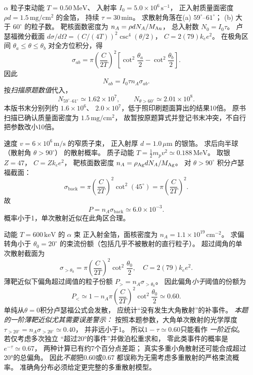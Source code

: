 $\alpha$ 粒子束动能
$T=0.50\,\mathrm{MeV}$、
入射率 $I_0=5.0\times10^6\,\mathrm{s^{-1}}$，
正入射质量面密度
$\rho d=1.5\,\mathrm{mg/cm^2}$ 的金箔，
持续 $\tau=30\,\mathrm{min}$。
求散射角落在(a) $59^\circ$--$61^\circ$；
(b) 大于 $60^\circ$ 的粒子数。
\exsolution
靶核面数密度为
$n_A=\rho dN_A/M_{\rm Au}$，
总入射数 $N_0=I_0\tau$。
卢瑟福微分截面
$d\sigma/d\Omega=(C/(4T))^2\csc^4(\theta/2)$，
$C=2(79)k_ee^2$。
在极角区间 $\theta_a\le\theta\le\theta_b$
对全方位积分，得
\[
 \sigma_{ab}=\pi\left(\frac C{2T}\right)^2
 \left[\cot^2\frac{\theta_a}{2}
 -\cot^2\frac{\theta_b}{2}\right].
\]
因此
\[
 \boxed{N_{ab}=I_0\tau n_A\sigma_{ab}}.
\]
按\emph{扫描原题数值}代入，
\[
 \boxed{N_{59^\circ\text{--}61^\circ}
 \simeq1.62\times10^7},\qquad
 \boxed{N_{\theta>60^\circ}\simeq2.01\times10^8}.
\]
\excheck 本版书末分别列约 $1.6\times10^6$、
$2.0\times10^7$，低于照印刷题面算出的结果10倍。
原书扫描已确认质量面密度为 $1.5\,\mathrm{mg/cm^2}$，
故暂按原题算式并登记书末冲突，不自行把参数改小10倍。

速度 $v=6\times10^6\,\mathrm{m/s}$ 的窄质子束，
正入射厚 $d=1.0\,\mu\mathrm m$ 的银箔。
求后向半球（散射角 $\theta>90^\circ$）
的散射概率。
\exsolution
质子动能
$T=\tfrac12m_pv^2\simeq0.188\,\mathrm{MeV}$。
取银 $Z=47$，
$C=Zk_ee^2$，
靶核面数密度
$n_A=\rho_{\rm Ag}dN_A/M_{\rm Ag}$。
对 $\theta>90^\circ$ 积分卢瑟福截面：
\[
 \sigma_{\mathrm{back}}=
 \pi\left(\frac C{2T}\right)^2\cot^2(45^\circ)
 =\pi\left(\frac C{2T}\right)^2.
\]
故
\[
 \boxed{P=n_A\sigma_{\mathrm{back}}
 \simeq6.0\times10^{-3}}.
\]
\excheck 概率小于1，单次散射近似在此角区合理。

动能 $T=600\,\mathrm{keV}$ 的 $\alpha$ 束
正入射金箔，面核密度为
$n_A=1.1\times10^{19}\,\mathrm{cm^{-2}}$。
求偏转角小于 $\theta_0=20^\circ$
的束流份额（包括几乎不被散射的直行粒子）。
\exsolution
超过阈角的单次散射截面为
\[
 \sigma_{>\theta_0}=
 \pi\left(\frac C{2T}\right)^2
 \cot^2\frac{\theta_0}{2},\quad C=2(79)k_ee^2.
\]
薄靶近似下偏角超过阈值的粒子份额
$P_>=n_A\sigma_{>\theta_0}$。
因此偏角\emph{小于}阈值的份额为
\[
 \boxed{P_<\simeq1-n_A\pi\left(\frac C{2T}\right)^2
 \cot^2\frac{\theta_0}{2}\simeq0.60}.
\]
\excheck 单纯从$\theta=0$积分卢瑟福公式会发散，
应统计“没有发生大角散射”的补事件。
\emph{本题的一阶薄靶近似尤其需要误差警示：}
按照本题参数，大角单次散射的光学厚度
$\tau_{>20^\circ}=n_A\sigma_{>20^\circ}\simeq0.40$，
并非远小于1。
所以$1-\tau\simeq0.60$只能看作
\emph{一阶近似}。若仅考虑多次独立
“超过20°的事件”并做泊松重求和，
零此类事件的概率是$e^{-\tau}\simeq0.67$，
两种计算已有约7个百分点差距；
真实多重小角散射还可能合成超过20°的总偏角。
因此\emph{不能}把0.60或0.67
都误称为无需考虑多重散射的严格束流概率。
准确角分布必须给定更完整的多重散射模型。

